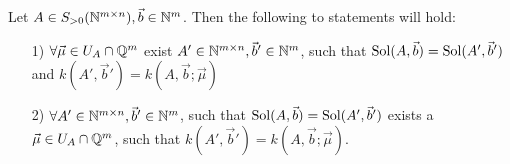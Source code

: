 \begin{lemma}
    \label{lemma:construct_gauss_steps}
    Let $A \in S_{>0}(\mathbb{N}^{m \times n}), \vec b \in \mathbb{N}^m$. Then the following to statements will hold:
    \begin{enumerate}
        \item[1)] $\forall \vec \mu \in U_A \cap \mathbb{Q}^m$ exist $A' \in \mathbb{N}^{m \times n}, \vec b' \in \mathbb{N}^m$, such that $\operatorname{Sol}(A, \vec b) = \operatorname{Sol}(A', \vec b')$ and
        $k(A', \vec b') = k(A, \vec b; \vec\mu)$
        \item[2)] $\forall  A' \in \mathbb{N}^{m \times n}, \vec b' \in \mathbb{N}^m$, such that $\operatorname{Sol}(A, \vec b) = \operatorname{Sol}(A', \vec b')$ exists a $\vec \mu \in U_A \cap \mathbb{Q}^m$, such that 
        $k(A', \vec b') = k(A, \vec b; \vec\mu)$.
    \end{enumerate}
\end{lemma}
